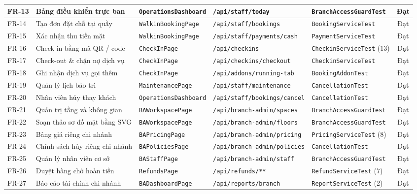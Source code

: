 \begin{table}[H]
\begin{tabular}{|p{1.0cm}|p{3.8cm}|p{2.6cm}|p{2.8cm}|p{2.6cm}|c|}
\hline
FR-13 & Bảng điều khiển trực ban & \texttt{OperationsDashboard} & \texttt{/api/staff/today} & \texttt{BranchAccessGuardTest} & Đạt \\
\hline
FR-14 & Tạo đơn đặt chỗ tại quầy & \texttt{WalkinBookingPage} & \texttt{/api/staff/bookings} & \texttt{BookingServiceTest} & Đạt \\
\hline
FR-15 & Xác nhận thu tiền mặt & \texttt{WalkinBookingPage} & \texttt{/api/staff/payments/cash} & \texttt{PaymentServiceTest} & Đạt \\
\hline
FR-16 & Check-in bằng mã QR / code & \texttt{CheckInPage} & \texttt{/api/checkins} & \texttt{CheckinServiceTest} (13) & Đạt \\
\hline
FR-17 & Check-out \& chặn nợ dịch vụ & \texttt{CheckInPage} & \texttt{/api/checkins/checkout} & \texttt{CheckinServiceTest} & Đạt \\
\hline
FR-18 & Ghi nhận dịch vụ gọi thêm & \texttt{CheckInPage} & \texttt{/api/addons/running-tab} & \texttt{BookingAddonTest} & Đạt \\
\hline
FR-19 & Quản lý lịch bảo trì & \texttt{MaintenancePage} & \texttt{/api/staff/maintenance} & \texttt{CancellationTest} & Đạt \\
\hline
FR-20 & Nhân viên hủy thay khách & \texttt{OperationsDashboard} & \texttt{/api/staff/bookings/cancel} & \texttt{CancellationTest} & Đạt \\
\hline
FR-21 & Quản trị tầng và không gian & \texttt{BAWorkspacePage} & \texttt{/api/branch-admin/spaces} & \texttt{BranchAccessGuardTest} & Đạt \\
\hline
FR-22 & Soạn thảo sơ đồ mặt bằng SVG & \texttt{BAWorkspacePage} & \texttt{/api/branch-admin/floors} & \texttt{BranchAccessGuardTest} & Đạt \\
\hline
FR-23 & Bảng giá riêng chi nhánh & \texttt{BAPricingPage} & \texttt{/api/branch-admin/pricing} & \texttt{PricingServiceTest} (8) & Đạt \\
\hline
FR-24 & Chính sách hủy riêng chi nhánh & \texttt{BAPoliciesPage} & \texttt{/api/branch-admin/policies} & \texttt{CancellationTest} & Đạt \\
\hline
FR-25 & Quản lý nhân viên cơ sở & \texttt{BAStaffPage} & \texttt{/api/branch-admin/staff} & \texttt{BranchAccessGuardTest} & Đạt \\
\hline
FR-26 & Duyệt hàng chờ hoàn tiền & \texttt{RefundsPage} & \texttt{/api/refunds/**} & \texttt{RefundServiceTest} (7) & Đạt \\
\hline
FR-27 & Báo cáo tài chính chi nhánh & \texttt{BADashboardPage} & \texttt{/api/reports/branch} & \texttt{ReportServiceTest} (2) & Đạt \\

\end{tabular}
\end{table}

